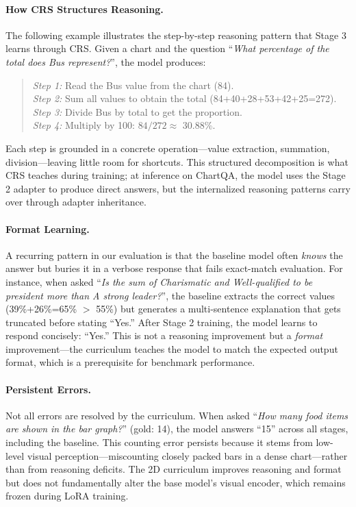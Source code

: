 ﻿\documentclass[journal]{IEEEtran}
\newcommand{\crs}{CRS}
\begin{document}
\paragraph{How \crs{} Structures Reasoning.}
The following example illustrates the step-by-step reasoning pattern that Stage 3 learns through \crs{}. Given a chart and the question ``\textit{What percentage of the total does Bus represent?}'', the model produces:
\begin{small}
\begin{quote}
\textit{Step 1:} Read the Bus value from the chart (84). \\
\textit{Step 2:} Sum all values to obtain the total (84+40+28+53+42+25=272). \\
\textit{Step 3:} Divide Bus by total to get the proportion. \\
\textit{Step 4:} Multiply by 100: $84/272 \approx$ 30.88\%.
\end{quote}
\end{small}
Each step is grounded in a concrete operation---value extraction, summation, division---leaving little room for shortcuts. This structured decomposition is what \crs{} teaches during training; at inference on ChartQA, the model uses the Stage 2 adapter to produce direct answers, but the internalized reasoning patterns carry over through adapter inheritance.

\paragraph{Format Learning.}
A recurring pattern in our evaluation is that the baseline model often \emph{knows} the answer but buries it in a verbose response that fails exact-match evaluation. For instance, when asked ``\textit{Is the sum of Charismatic and Well-qualified to be president more than A strong leader?}'', the baseline extracts the correct values (39\%+26\%=65\% $>$ 55\%) but generates a multi-sentence explanation that gets truncated before stating ``Yes.'' After Stage 2 training, the model learns to respond concisely: ``Yes.'' This is not a reasoning improvement but a \emph{format} improvement---the curriculum teaches the model to match the expected output format, which is a prerequisite for benchmark performance.

\paragraph{Persistent Errors.}
Not all errors are resolved by the curriculum. When asked ``\textit{How many food items are shown in the bar graph?}'' (gold: 14), the model answers ``15'' across all stages, including the baseline. This counting error persists because it stems from low-level visual perception---miscounting closely packed bars in a dense chart---rather than from reasoning deficits. The 2D curriculum improves reasoning and format but does not fundamentally alter the base model's visual encoder, which remains frozen during LoRA training.
\end{document}
